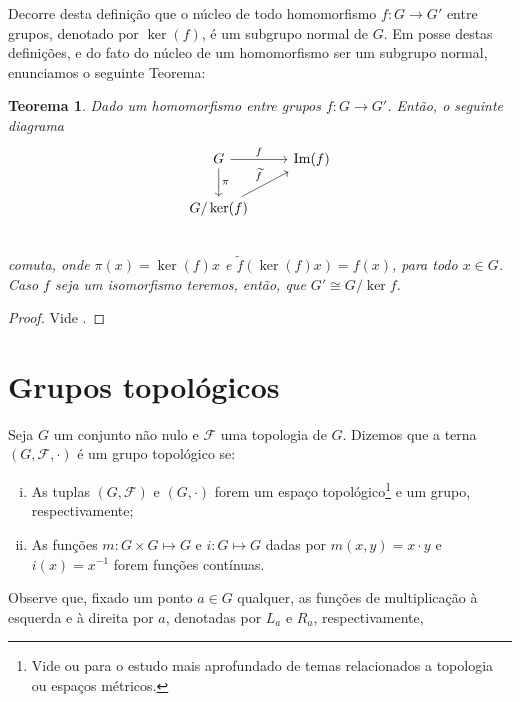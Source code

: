 \documentclass[twoside,openright,titlepage,numbers=noenddot,headinclude,  lineheaders footinclude=true,cleardoublepage=empty,
                                BCOR=5mm,paper=a4,fontsize=12pt ]{scrbook}
\newtheorem{teo}{Teorema}[chapter]
\theoremstyle{definition}
\DeclareMathOperator{\im}{Im}
\begin{document}
Decorre desta definição que o núcleo de todo homomorfismo $f: G \rightarrow G'$ entre grupos, denotado 
por $\ker(f)$, é um subgrupo normal de $G$. Em posse destas definições, e do fato do núcleo
de um homomorfismo ser um subgrupo normal, enunciamos o seguinte Teorema:
\begin{teo} \label{teo:isomorfismo}
Dado um homomorfismo entre grupos $f: G \rightarrow G'$. Então, o seguinte diagrama 
\begin{displaymath}
\begin{tikzcd}
    G \arrow{d }{\pi} \arrow{r}{f} & \im(f) \\
    G/\ker(f) \arrow{ur}{\widetilde{f}} \\
\end{tikzcd}
\end{displaymath}
comuta, onde $\pi(x) = \ker(f)x$ e $\widetilde{f}(\ker(f)x) = f(x)$, para todo $x \in G$. Caso $f$ seja um isomorfismo teremos,
então, que $G' \cong G/\ker{f}$.
\end{teo}
\begin{proof} Vide \cite{agozzine}. \end{proof}

\section{Grupos topol\'ogicos}

Seja $G$ um conjunto não nulo e $\mathscr{F}$ uma topologia de $G$. 
Dizemos que a terna $(G, \mathscr{F}, \cdot)$ é um grupo topológico se:
\begin{enumerate}[(i)]
	\item As tuplas $(G, \mathscr{F})$ e $(G, \cdot)$ forem um espaço topológico\footnote{Vide \cite{elon} ou
\cite{elon2} para o estudo mais aprofundado de temas relacionados a topologia ou espaços métricos.} e um grupo,
 respectivamente;
	\item As funções $m: G \times G \mapsto G$ e $i: G \mapsto G$ dadas por $m(x,y) = x \cdot y$ e $i(x) = x^{-1}$ 
    forem funções contínuas.   
\end{enumerate}
Observe que, fixado um ponto $a \in G$ qualquer, as funções de multiplicação à esquerda e à direita por $a$, 
denotadas por $L_a$ e $R_a$, respectivamente,
\end{document}
